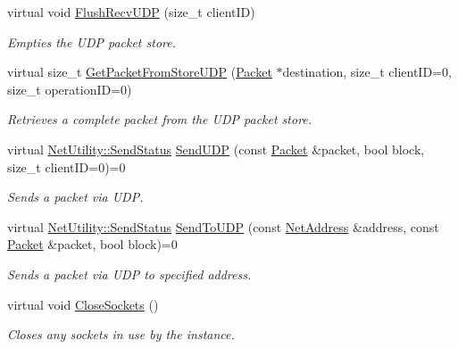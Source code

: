 \begin{DoxyCompactItemize}
virtual void \hyperlink{class_net_instance_u_d_p_a1d158088473a09b1366428dcf90a5907}{FlushRecvUDP} (size\_\-t clientID)
\begin{DoxyCompactList}\small\item\em Empties the UDP packet store. \item\end{DoxyCompactList}\item 
virtual size\_\-t \hyperlink{class_net_instance_u_d_p_a9b2559723f75d9317aac9ec19674180d}{GetPacketFromStoreUDP} (\hyperlink{class_packet}{Packet} $\ast$destination, size\_\-t clientID=0, size\_\-t operationID=0)
\begin{DoxyCompactList}\small\item\em Retrieves a complete packet from the UDP packet store. \item\end{DoxyCompactList}\item 
virtual \hyperlink{class_net_utility_a8051eca61204ffd818281419bbf44736}{NetUtility::SendStatus} \hyperlink{class_net_instance_u_d_p_afa565c78a2549b3b21ea4b1dedd33793}{SendUDP} (const \hyperlink{class_packet}{Packet} \&packet, bool block, size\_\-t clientID=0)=0
\begin{DoxyCompactList}\small\item\em Sends a packet via UDP. \item\end{DoxyCompactList}\item 
virtual \hyperlink{class_net_utility_a8051eca61204ffd818281419bbf44736}{NetUtility::SendStatus} \hyperlink{class_net_instance_u_d_p_aab521333fd0aabf0b8343fe132494975}{SendToUDP} (const \hyperlink{class_net_address}{NetAddress} \&address, const \hyperlink{class_packet}{Packet} \&packet, bool block)=0
\begin{DoxyCompactList}\small\item\em Sends a packet via UDP to specified address. \item\end{DoxyCompactList}\item 
\hypertarget{class_net_instance_u_d_p_a34eddd0dac655a1f3ec2950f6c15a456}{
virtual void \hyperlink{class_net_instance_u_d_p_a34eddd0dac655a1f3ec2950f6c15a456}{CloseSockets} ()}
\label{class_net_instance_u_d_p_a34eddd0dac655a1f3ec2950f6c15a456}

\begin{DoxyCompactList}\small\item\em Closes any sockets in use by the instance. \item\end{DoxyCompactList}\end{DoxyCompactItemize}
